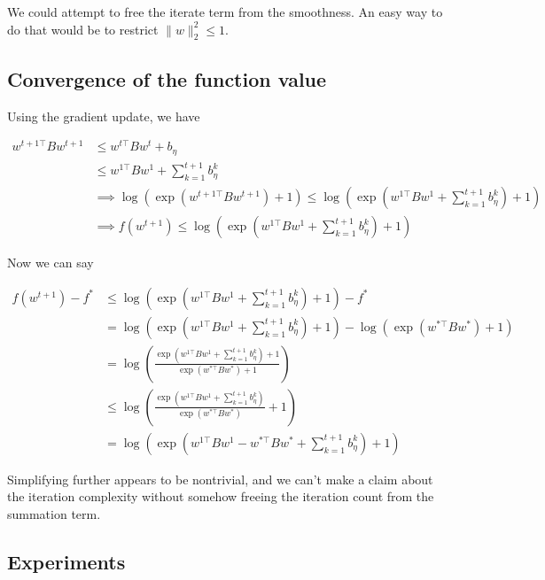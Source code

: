 \documentclass[11pt]{article}
\begin{document}
We could attempt to free the iterate term from the smoothness. An easy way to do that would be to restrict $\|w\|_2^2 \leq 1$.

\subsection{Convergence of the function value}

Using the gradient update, we have

\begin{align*}
    w^{t+1\top}Bw^{t+1} &\leq w^{t\top}Bw^{t} + b_\eta \\
    &\leq w^{1\top}Bw^{1} + \sum_{k=1}^{t+1} b_\eta^k \\
    &\implies \log( \exp(w^{t+1\top}Bw^{t+1}) + 1) \leq \log( \exp(w^{1\top}Bw^{1} + \sum_{k=1}^{t+1} b_\eta^k) + 1) \\
    &\implies f(w^{t+1}) \leq \log( \exp(w^{1\top}Bw^{1} + \sum_{k=1}^{t+1} b_\eta^k) + 1)
\end{align*}

Now we can say

\begin{align*}
    f(w^{t+1}) - f^* &\leq \log( \exp(w^{1\top}Bw^{1} + \sum_{k=1}^{t+1} b_\eta^k) + 1) - f^* \\
    &= \log( \exp(w^{1\top}Bw^{1} + \sum_{k=1}^{t+1} b_\eta^k) + 1) - \log( \exp(w^{*\top}Bw^{*}) + 1) \\
    &= \log \left( \frac{\exp(w^{1\top}Bw^{1} + \sum_{k=1}^{t+1} b_\eta^k) + 1}{\exp(w^{*\top}Bw^{*}) + 1} \right) \\
    &\leq \log \left( \frac{\exp(w^{1\top}Bw^{1} + \sum_{k=1}^{t+1} b_\eta^k)}{\exp(w^{*\top}Bw^{*})} + 1 \right) \\
    &= \log \left( \exp \left(w^{1\top}Bw^{1} - w^{*\top}Bw^{*} + \sum_{k=1}^{t+1} b_\eta^k \right) + 1 \right)
\end{align*}

Simplifying further appears to be nontrivial, and we can't make a claim about the iteration complexity without somehow freeing the iteration count from the summation term.

\subsection{Experiments}

\end{document}
